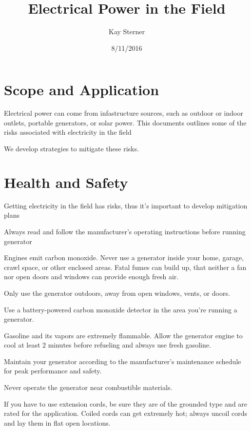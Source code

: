 \documentclass[12pt]{../SOP3_alpha}
\title{Electrical Power in the Field}
\date{8/11/2016}
\author{Kay Sterner}
\begin{document}


\maketitle

\section{Scope and Application}

\NP Electrical power can come from infastructure sources, such as outdoor or indoor outlets, portable generators, or solar power.
\NP This documents outlines some of the risks associated with electricity in the field

\NP We develop strategies to mitigate these risks.

\section{Health and Safety}

\NP Getting electricity in the field has risks, thus it's important to develop mitigation plans

\NP Always read and follow the manufacturer's operating instructions before running
generator

\NP Engines emit carbon monoxide. Never use a generator inside your home, garage, crawl space, or other enclosed areas. Fatal fumes can build up, that neither a fan nor open doors and windows can provide enough fresh air.

\NP Only use the generator outdoors, away from open windows, vents, or doors.

\NP Use a battery-powered carbon monoxide detector in the area you're running a generator.

\NP Gasoline and its vapors are extremely flammable. Allow the generator engine to cool at least 2 minutes before refueling and always use fresh gasoline. 

\NP Maintain your generator according to the manufacturer’s maintenance schedule for peak performance and safety.

\NP Never operate the generator near combustible materials.

\NP If you have to use extension cords, be sure they are of the grounded type and are rated for the application. Coiled cords can get extremely hot; always uncoil cords and lay them in flat open locations.
\end{document}
